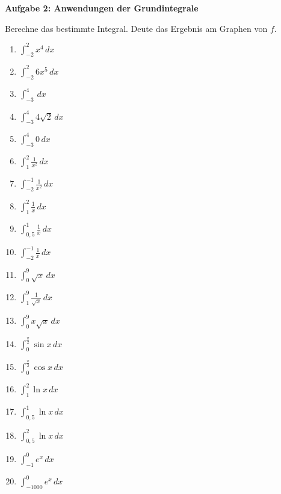 \documentclass[a4paper,12pt]{article}
\newcommand{\Aufgabe}[1]{
  {
  \vspace*{0.5cm}
  \textsf{\textbf{Aufgabe #1}}
  \vspace*{0.2cm}
  
  }
}
\begin{document}
\vspace{1cm}
\Aufgabe{2: Anwendungen der Grundintegrale}
Berechne das bestimmte Integral. Deute das Ergebnis am Graphen von $f$.
\begin{enumerate}[label={\alph*)}, topsep=5pt,itemsep=4ex,partopsep=1ex,parsep=1ex]
  \item $\int_{-2}^{2} x^4\,dx$
  \item $\int_{-2}^{2} 6x^5\,dx$
  \item $\int_{-3}^{4}\,dx$
  \item $\int_{-3}^{4}4\sqrt{2}\,dx$
  \item $\int_{-3}^{4}0\,dx$
  \item $\int_{1}^{2}\frac{1}{x^2}\,dx$
  \item $\int_{-2}^{-1}\frac{1}{x^2}\,dx$
  \item $\int_{1}^{2}\frac{1}{x}\,dx$
  \item $\int_{0,5}^{1}\frac{1}{x}\,dx$
  \item $\int_{-2}^{-1}\frac{1}{x}\,dx$
  \item $\int_{0}^{9}\sqrt{x}\,dx$
  \item $\int_{1}^{9}\frac{1}{\sqrt{x}}\,dx$
  \item $\int_{0}^{9}x\sqrt{x}\,dx$
  \item $\int_{0}^{\frac{\pi}{2}}\sin{x}\,dx$
  \item $\int_{0}^{\frac{\pi}{2}}\cos{x}\,dx$
  \item $\int_{1}^{2}\ln{x}\,dx$
  \item $\int_{0,5}^{1}\ln{x}\,dx$
  \item $\int_{0,5}^{2}\ln{x}\,dx$
  \item $\int_{-1}^{0}e^x\,dx$
  \item $\int_{-1000}^{0}e^x\,dx$
\end{enumerate}
\end{document}
